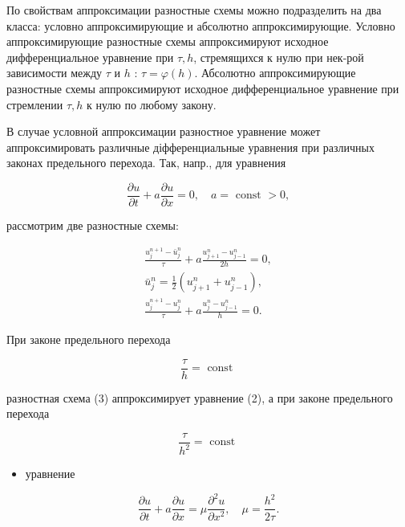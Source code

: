 \documentclass[10pt]{article}
\begin{document}
По свойствам аппроксимации разностные схемы можно подразделить на два класса: условно аппроксимирующие и абсолютно аппроксимирующие. Условно аппроксимирующие разностные схемы аппроксимируют исходное дифференциальное уравнение при $\tau, h$, стремящихся к нулю при нек-рой зависимости между $\tau$ и $h$ : $\tau=\varphi(h)$. Абсолютно аппроксимирующие разностные схемы аппроксимируют исходное дифференциальное уравнение при стремлении $\tau, h$ к нулю по любому закону.



В случае условной аппроксимации разностное уравнение может аппроксимировать различные діфференциальные уравнения при различных законах предельного перехода. Так, напр., для уравнения



\[

\frac{\partial u}{\partial t}+a \frac{\partial u}{\partial x}=0, \quad a=\text { const }>0,

\]



рассмотрим две разностные схемы:



\[

\begin{gathered}

\frac{u_{j}^{n+1}-\bar{u}_{j}^{n}}{\tau}+a \frac{u_{j+1}^{n}-u_{j-1}^{n}}{2 h}=0, \\

\bar{u}_{j}^{n}=\frac{1}{2}\left(u_{j+1}^{n}+u_{j-1}^{n}\right), \\

\frac{u_{j}^{n+1}-u_{j}^{n}}{\tau}+a \frac{u_{j}^{n}-u_{j-1}^{n}}{h}=0 .

\end{gathered}

\]



При законе предельного перехода



\[

\frac{\tau}{h}=\text { const }

\]



разностная схема (3) аппроксимирует уравнение (2), а при законе предельного перехода



\[

\frac{\tau}{h^{2}}=\text { const }

\]



\begin{itemize}

  \item уравнение

\end{itemize}



\[

\frac{\partial u}{\partial t}+a \frac{\partial u}{\partial x}=\mu \frac{\partial^{2} u}{\partial x^{2}}, \quad \mu=\frac{h^{2}}{2 \tau} .

\]
\end{document}
